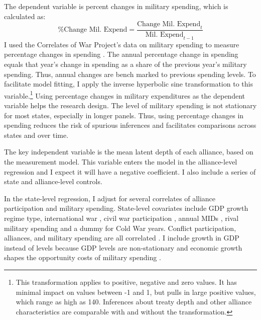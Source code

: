\documentclass[12pt]{article}
\begin{document}
The dependent variable is percent changes in military spending, which is calculated as:
\begin{equation}
\mbox{\% Change Mil. Expend} = \frac{ \mbox{Change Mil. Expend}_t }{ \mbox{Mil. Expend}_{t-1} }
\end{equation} 
I used the Correlates of War Project's data on military spending to measure percentage changes in spending \citep{SingerCINC1988}.
The annual percentage change in spending equals that year's change in spending as a share of the previous year's military spending.
Thus, annual changes are bench marked to previous spending levels. 
To facilitate model fitting, I apply the inverse hyperbolic sine transformation to this variable.\footnote{This transformation applies to positive, negative and zero values. It has minimal impact on values between -1 and 1, but pulls in large positive values, which range as high as 140. Inferences about treaty depth and other alliance characteristics are comparable with and without the transformation.}
Using percentage changes in military expenditures as the dependent variable helps the research design. 
The level of military spending is not stationary for most states, especially in longer panels. 
Thus, using percentage changes in spending reduces the risk of spurious inferences and facilitates comparisons across states and over time. 


The key independent variable is the mean latent depth of each alliance, based on the measurement model. 
This variable enters the model in the alliance-level regression and I expect it will have a negative coefficient. 
I also include a series of state and alliance-level controls.


In the state-level regression, I adjust for several correlates of alliance participation and military spending. 
State-level covariates include GDP growth \citep{Boltetal2018} regime type, international war \citep{Reiteretal2016}, civil war participation \citep{SarkeesWayman2010}, annual MIDs \citep{Gibleretal2016}, rival military spending \citep{ThompsonDreyer2012} and a dummy for Cold War years.
Conflict participation, alliances, and military spending are all correlated \citep{SeneseVasquez2008}.
I include growth in GDP instead of levels because GDP levels are non-stationary and economic growth shapes the opportunity costs of military spending \citep{Kimball2010, Zielinskietal2017}.  
\end{document}

